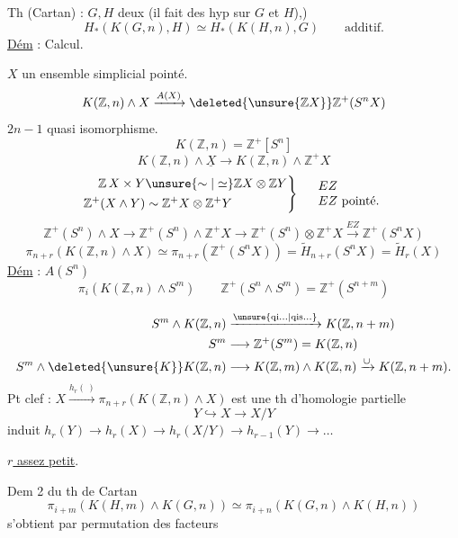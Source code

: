 
Th (Cartan) : $G,H$ deux   (il fait des hyp sur $G$ et $H$),)
\[
H_*(K(G,n),H)\simeq H_*(K(H,n),G)\qquad\text{additif.}
\]
\uline{Dém} : Calcul.

\begin{center}\uuline{\hspace{2cm}}\end{center}
$X$ un ensemble simplicial pointé.
\[
K(\mathbb Z,n)\wedge X\xrightarrow{A(X)}\deleted{\unsure{\mathbb Z X}}\mathbb Z^{+}(S^nX)
\]
$2n-1$ quasi isomorphisme.
\[
K(\mathbb Z,n)=\mathbb Z^{+}[S^n]
\]
\[
K(\mathbb Z,n)\wedge\underline X\longrightarrow K(\mathbb Z,n)\wedge\mathbb Z^+X
\]
\[
\left.\begin{aligned}
\mathbb Z\,X\times Y&\unsure{\sim|\simeq}\mathbb ZX\otimes\mathbb ZY\\
\mathbb Z^+(X\wedge Y)&\sim\mathbb Z^+X\otimes\mathbb Z^+Y
\end{aligned}\right\}\quad
\begin{array}{l}EZ\\ EZ\ \text{pointé.}\end{array}
\]
\[
\mathbb Z^+(S^n)\wedge X\longrightarrow\mathbb Z^+(S^n)\wedge\mathbb Z^+X
\longrightarrow\mathbb Z^+(S^n)\otimes\mathbb Z^+X\xrightarrow{EZ}\mathbb Z^+(S^nX)
\]
\[
\pi_{n+r}(K(\mathbb Z,n)\wedge X)\simeq\pi_{n+r}(\mathbb Z^+(S^nX))
=\widetilde H_{n+r}(S^nX)=\widetilde H_r(X)
\]
\uline{Dém} : $A(S^n)$
\[
\pi_i(K(\mathbb Z,n)\wedge S^m)\qquad
\mathbb Z^+(S^n\wedge S^m)=\mathbb Z^+(S^{n+m})
\]

\noindent{}
\[
\begin{aligned}
S^m\wedge K(\mathbb Z,n)&\xrightarrow{\unsure{\mathrm{qi}\ldots|\mathrm{qis}\ldots}} K(\mathbb Z,n+m)\\
S^m&\longrightarrow\mathbb Z^+(S^m)=K(\mathbb Z,n)\\
S^m\wedge\deleted{\unsure{K}}K(\mathbb Z,n)&\longrightarrow K(\mathbb Z,m)\wedge K(\mathbb Z,n)\xrightarrow{\cup}K(\mathbb Z,n+m).
\end{aligned}
\]
Pt clef : $X\xrightarrow{h_r(\ )}\pi_{n+r}(K(\mathbb Z,n)\wedge X)$ est une th d'homologie partielle
\[
Y\hookrightarrow X\longrightarrow X/Y
\]
induit $h_r(Y)\longrightarrow h_r(X)\longrightarrow h_r(X/Y)\longrightarrow h_{r-1}(Y)\longrightarrow\ldots$

\uline{$r$ assez petit}.

Dem 2 du th de Cartan
\[
\pi_{i+m}(K(H,m)\wedge K(G,n))\simeq\pi_{i+n}(K(G,n)\wedge K(H,n))
\]
s'obtient par permutation des facteurs
